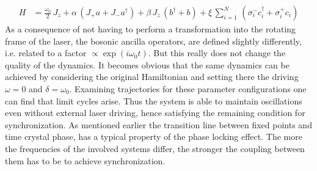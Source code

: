 \begin{align*}
    H &= \frac{\omega_0}{2}\,J_z +\alpha\,(J_+a + J_-a^\dagger)+ \beta\,J_z\,(b^\dagger+b)+\xi\,\sum_{i=1}^N\,(\sigma_i^-c_i^\dagger+\sigma_i^+c_i)
\end{align*}
As a consequence of not having to perform a transformation into the rotating frame of the laser, the bosonic ancilla operators, are defined slightly differently, i.e. related to a factor $\propto\exp(i\omega_0t)$. But this really does not change the quality of the dynamics. It becomes obvious that the same dynamics can be achieved by considering the original Hamiltonian and setting there the driving $\omega=0$ and $\delta=\omega_0$. Examining trajectories for these parameter configurations one can find that limit cycles arise. Thus the system is able to maintain oscillations even without external laser driving, hence satisfying the remaining condition for synchronization. As mentioned earlier the transition line between fixed points and time crystal phase, has a typical property of the phase locking effect. The more the frequencies of the involved systems differ, the stronger the coupling between them has to be to achieve synchronization. 
